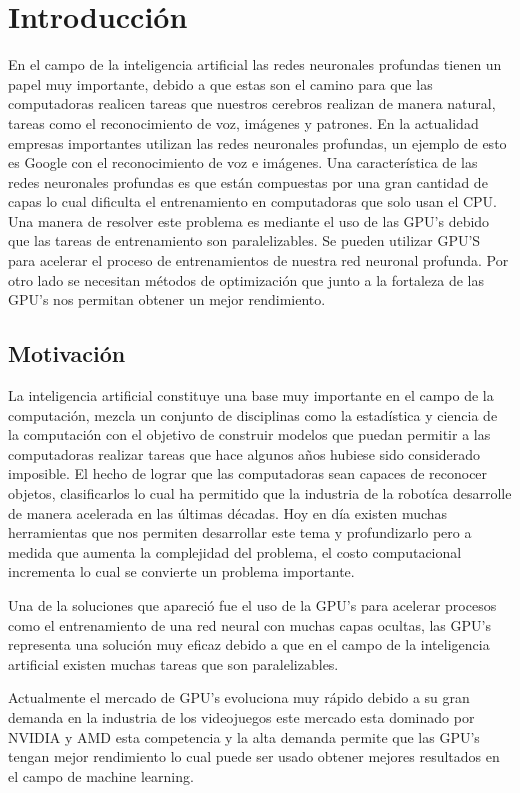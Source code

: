 \chapter{Introducción}
En el campo de la inteligencia artificial las redes neuronales profundas tienen un papel muy importante, debido a que estas son el camino para que las computadoras realicen tareas que nuestros cerebros realizan de manera natural, tareas como el reconocimiento de voz, imágenes y patrones. En la actualidad empresas importantes utilizan las redes neuronales profundas, un ejemplo de esto es Google con el reconocimiento de voz e imágenes. Una característica de las redes neuronales profundas es que están compuestas por una gran cantidad de capas lo cual dificulta el entrenamiento en computadoras que solo usan el CPU. Una manera de resolver este problema es mediante el uso de las GPU's debido que las tareas de entrenamiento son paralelizables. Se pueden utilizar GPU'S para acelerar el proceso de entrenamientos de nuestra red neuronal profunda. Por otro lado se necesitan métodos de optimización que junto a la fortaleza de las GPU's nos permitan obtener un mejor rendimiento.

\section{Motivación}
La inteligencia artificial constituye una base muy importante en el campo de la computación, mezcla un conjunto de disciplinas como la estadística y ciencia de la computación con el objetivo de construir modelos que puedan permitir a las computadoras realizar tareas que hace algunos años hubiese sido considerado imposible. El hecho de lograr que las computadoras sean capaces de reconocer objetos, clasificarlos lo cual ha permitido que la industria de la robotíca desarrolle de manera acelerada en las últimas décadas.  Hoy en día existen muchas herramientas que nos permiten desarrollar este tema y profundizarlo pero a medida que aumenta la complejidad del problema, el costo computacional incrementa lo cual se convierte un problema importante.

 Una de la soluciones que apareció fue el uso de la GPU's para acelerar procesos como el entrenamiento de una red neural con muchas capas ocultas, las GPU's representa una solución muy eficaz debido a que en el campo de la inteligencia artificial existen muchas tareas que son paralelizables.

Actualmente el mercado de GPU's evoluciona muy rápido debido a su gran demanda en la industria de los videojuegos este mercado esta dominado por NVIDIA y AMD esta competencia y la alta demanda permite que las GPU's tengan mejor rendimiento lo cual puede ser usado obtener mejores resultados en el campo de machine learning. 

